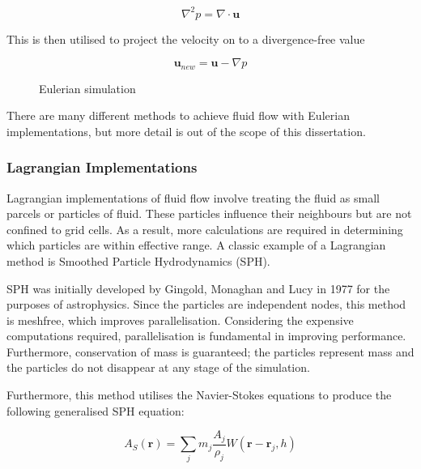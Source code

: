 \documentclass[12pt]{article}
\newcommand{\wideimage}[2][]{%
  \makebox[\textwidth][c]{\texttt{[image: \#2]}}%
}
\begin{document}
    \begin{equation}
        \nabla^2{p} = \nabla \cdot \textbf{u}
    \end{equation} 
    
    This is then utilised to project the velocity on to a divergence-free value
    
    \begin{equation}
        \textbf{u}_{new} = \textbf{u} - \nabla{p}
    \end{equation}

    \begin{figure}[H]
        \begin{center}
            \wideimage[width=0.7\textwidth]{eulerianEG.png}
            \caption{Eulerian simulation \cite{eulerianeg}}
        \end{center}
    \end{figure}

    There are many different methods to achieve fluid flow with Eulerian implementations, but more detail is out of the scope of this dissertation.

    \subsubsection{Lagrangian Implementations}

    Lagrangian implementations of fluid flow involve treating the fluid as small parcels or particles of fluid. These particles influence their neighbours but are not confined to grid cells. As a result, more calculations are required in determining which particles are within effective range. A classic example of a Lagrangian method is Smoothed Particle Hydrodynamics (SPH).

    SPH was initially developed by Gingold, Monaghan and Lucy in 1977 for the purposes of astrophysics\cite{sca}. Since the particles are independent nodes, this method is meshfree, which improves parallelisation. Considering the expensive computations required, parallelisation is fundamental in improving performance. Furthermore, conservation of mass is guaranteed; the particles represent mass and the particles do not disappear at any stage of the simulation.

    Furthermore, this method utilises the Navier-Stokes equations to produce the following generalised SPH equation:

    \begin{equation}
        A_S(\textbf{r}) = \sum_{j}{m_j \frac{A_j}{\rho_j}W(\textbf{r} - \textbf{r}_j, h)}
    \end{equation}
\end{document}

